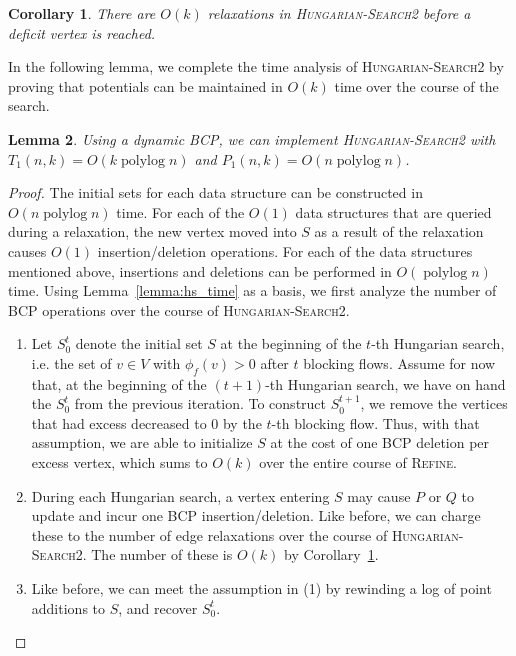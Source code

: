 \documentclass[11pt]{article}
\def\polylog{\mathop{\mathrm{polylog}}}
\def\fsupply{\phi}
\theoremstyle{plain}
\newtheorem{lemma}{Lemma}[section]
\newtheorem{corollary}[lemma]{Corollary}
\numberwithin{figure}{section}
\begin{document}
\begin{corollary}
\label{corollary:goldberg_hs_length}
There are $O(k)$ relaxations in \textsc{Hungarian-Search2} before a deficit
vertex is reached.
\end{corollary}

In the following lemma, we complete the time analysis of
\textsc{Hungarian-Search2} by proving that potentials can be maintained in
$O(k)$ time over the course of the search.

\begin{lemma}
\label{lemma:goldberg_hs_time}
Using a dynamic BCP, we can implement \textsc{Hungarian-Search2} with
$T_1(n, k) = O(k\polylog n)$ and $P_1(n, k) = O(n\polylog n)$.
\end{lemma}

\begin{proof}
The initial sets for each data structure can be constructed in
$O(n\polylog n)$ time.
For each of the $O(1)$ data structures that are queried during a relaxation,
the new vertex moved into $S$ as a result of the relaxation causes $O(1)$
insertion/deletion operations.
For each of the data structures mentioned above, insertions and deletions
can be performed in $O(\polylog n)$ time.
Using Lemma~\ref{lemma:hs_time} as a basis, we first analyze the number of BCP
operations over the course of \textsc{Hungarian-Search2}.

\begin{enumerate}
\item Let $S^t_0$ denote the initial set $S$ at the beginning of the
	$t$-th Hungarian search, i.e. the set of $v \in V$ with
	$\fsupply_f(v) > 0$ after $t$ blocking flows.
	Assume for now that, at the beginning of the $(t+1)$-th
	Hungarian search, we have on hand the $S^t_0$ from the
	previous iteration.
	To construct $S^{t+1}_0$, we remove the vertices that had
	excess decreased to 0 by the $t$-th blocking flow.
	Thus, with that assumption, we are able to initialize $S$ at
	the cost of one BCP deletion per excess vertex, which sums to
	$O(k)$ over the entire course of \textsc{Refine}.
\item During each Hungarian search, a vertex entering $S$ may cause $P$
	or $Q$ to update and incur one BCP insertion/deletion.
	Like before, we can charge these to the number of edge
	relaxations over the course of \textsc{Hungarian-Search2}.
	The number of these is $O(k)$ by
	Corollary~\ref{corollary:goldberg_hs_length}.
\item Like before, we can meet the assumption in (1) by rewinding a log
	of point additions to $S$, and recover $S^t_0$.
\end{enumerate}


\end{proof}
\end{document}
